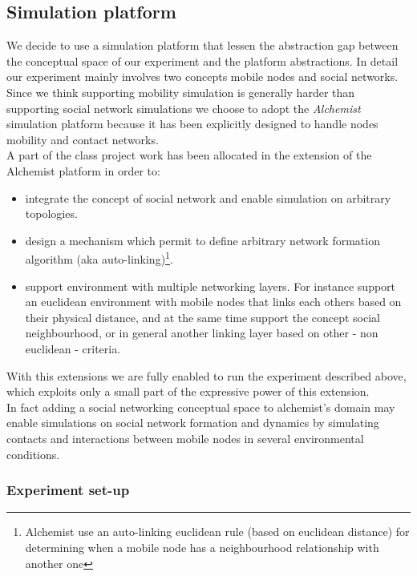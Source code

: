 \subsection{Simulation platform}
\label{exp_platform}

We decide to use a simulation platform that lessen the abstraction gap between the conceptual space of our experiment and the platform abstractions. In detail our experiment mainly involves two concepts mobile nodes and social networks. Since we think supporting mobility simulation is generally harder than supporting social network simulations we choose to adopt the \emph{Alchemist} simulation platform\cite{pianini-jos2013} because it has been explicitly designed to handle nodes mobility and contact networks.\\
A part of the class project work has been allocated in the extension of the Alchemist platform in order to: 
\begin{itemize}
\item integrate the concept of social network and enable simulation on arbitrary topologies.
\item design a mechanism which permit to define arbitrary network formation algorithm (aka auto-linking)\footnote{Alchemist use an auto-linking euclidean rule (based on euclidean distance) for determining when a mobile node has a neighbourhood relationship with another one}.
\item support environment with multiple networking layers. For instance support an euclidean environment with mobile nodes that links each others based on their physical distance, and at the same time support the concept social neighbourhood, or in general another linking layer based on other - non euclidean - criteria.
\end{itemize}

With this extensions we are fully enabled to run the experiment described above, which exploits only a small part of the expressive power of this extension.\\
In fact adding a social networking conceptual space to alchemist's domain may enable simulations on social network formation and dynamics by simulating contacts and interactions between mobile nodes in several environmental conditions.\\


\subsubsection{Experiment set-up}
\label{exp_setup}

